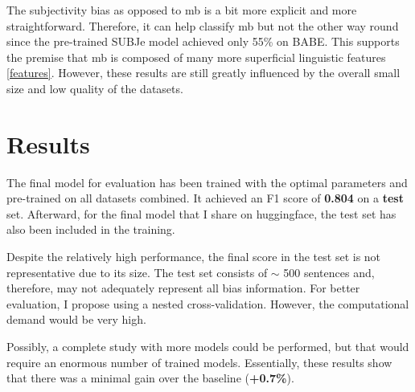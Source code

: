 The subjectivity bias as opposed to \gls{mb} is a bit more explicit and more straightforward. Therefore, it can help classify \gls{mb} but not the other way round since the pre-trained SUBJe model achieved only 55\% on BABE. This supports the premise that \gls{mb} is composed of many more superficial linguistic features \ref{features}. However, these results are still greatly influenced by the overall small size and low quality of the datasets.




\section{Results}
The final model for evaluation has been trained with the optimal parameters and pre-trained on all datasets combined. It achieved an F1 score of \textbf{0.804} on a \textbf{test} set. Afterward, for the final model that I share on huggingface, the test set has also been included in the training.


Despite the relatively high performance, the final score in the test set is not representative due to its size. The test set consists of $\sim$ 500 sentences and, therefore, may not adequately represent all bias information. For better evaluation, I propose using a nested cross-validation. However, the computational demand would be very high. 

Possibly, a complete study with more models could be performed, but that would require an enormous number of trained models. Essentially, these results show that there was a minimal gain over the baseline (\textbf{+0.7\%}).

\begin{figure}
\end{figure}


